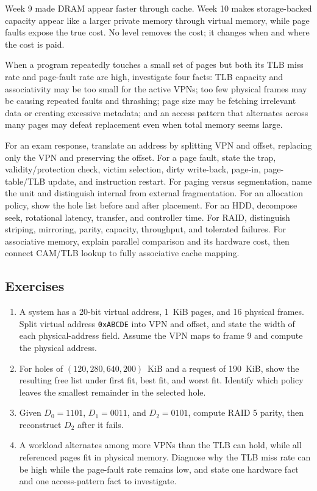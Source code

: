 \documentclass[11pt]{article}
\begin{document}
Week 9 made DRAM appear faster through cache. Week 10 makes storage-backed
capacity appear like a larger private memory through virtual memory, while
page faults expose the true cost. No level removes the cost; it changes when
and where the cost is paid.

When a program repeatedly touches a small set of pages but both its TLB miss
rate and page-fault rate are high, investigate four facts: TLB capacity and
associativity may be too small for the active VPNs; too few physical frames may
be causing repeated faults and thrashing; page size may be fetching irrelevant
data or creating excessive metadata; and an access pattern that alternates
across many pages may defeat replacement even when total memory seems large.

For an exam response, translate an address by splitting VPN and offset,
replacing only the VPN and preserving the offset. For a page fault, state the
trap, validity/protection check, victim selection, dirty write-back, page-in,
page-table/TLB update, and instruction restart. For paging versus segmentation,
name the unit and distinguish internal from external fragmentation. For an
allocation policy, show the hole list before and after placement. For an HDD,
decompose seek, rotational latency, transfer, and controller time. For RAID,
distinguish striping, mirroring, parity, capacity, throughput, and tolerated
failures. For associative memory, explain parallel comparison and its hardware
cost, then connect CAM/TLB lookup to fully associative cache mapping.

\subsection*{Exercises}
\begin{enumerate}
  \item A system has a 20-bit virtual address, 1~KiB pages, and 16 physical
        frames. Split virtual address \texttt{0xABCDE} into VPN and offset,
        and state the width of each physical-address field. Assume the VPN
        maps to frame 9 and compute the physical address.
  \item For holes of $(120, 280, 640, 200)$~KiB and a request of 190~KiB,
        show the resulting free list under first fit, best fit, and worst fit.
        Identify which policy leaves the smallest remainder in the selected
        hole.
  \item Given $D_0=1101$, $D_1=0011$, and $D_2=0101$, compute RAID 5 parity,
        then reconstruct $D_2$ after it fails.
  \item A workload alternates among more VPNs than the TLB can hold, while
        all referenced pages fit in physical memory. Diagnose why the TLB miss
        rate can be high while the page-fault rate remains low, and state one
        hardware fact and one access-pattern fact to investigate.
\end{enumerate}
\end{document}
